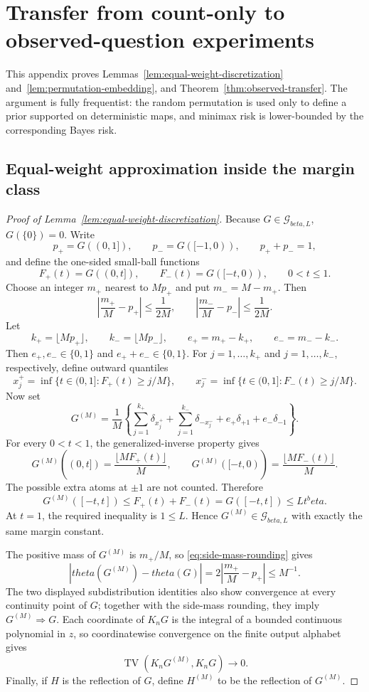 \documentclass[11pt]{article}
\def\beta{beta}%
\def\theta{theta}%
\newcommand{\TV}{\operatorname{TV}}
\newcommand{\calG}{\mathcal G}
\begin{document}
\section{Transfer from count-only to observed-question experiments}
\label{app:observed-transfer}

This appendix proves Lemmas~\ref{lem:equal-weight-discretization} and~\ref{lem:permutation-embedding}, and Theorem~\ref{thm:observed-transfer}.  The argument is fully frequentist: the random permutation is used only to define a prior supported on deterministic maps, and minimax risk is lower-bounded by the corresponding Bayes risk.

\subsection{Equal-weight approximation inside the margin class}

\begin{proof}[Proof of Lemma~\ref{lem:equal-weight-discretization}]
Because $G\in\calG_{\beta,L}$, $G(\{0\})=0$.  Write
\[
p_+=G((0,1]),
\qquad
p_-=G([-1,0)),
\qquad
p_++p_-=1,
\]
and define the one-sided small-ball functions
\[
F_+(t)=G((0,t]),
\qquad
F_-(t)=G([-t,0)),
\qquad 0<t\le1.
\]
Choose an integer $m_+$ nearest to $Mp_+$ and put $m_-=M-m_+$.  Then
\begin{equation}
\label{eq:side-mass-rounding}
\left|\frac{m_+}{M}-p_+\right|\le\frac1{2M},
\qquad
\left|\frac{m_-}{M}-p_-\right|\le\frac1{2M}.
\end{equation}
Let
\[
k_+=\lfloor Mp_+\rfloor,
\qquad
k_-=\lfloor Mp_-\rfloor,
\qquad
e_+=m_+-k_+,
\qquad
e_-=m_--k_-.
\]
Then $e_+,e_-\in\{0,1\}$ and $e_++e_-\in\{0,1\}$.  For $j=1,\dots,k_+$ and $j=1,\dots,k_-$, respectively, define outward quantiles
\[
x_j^+
=
\inf\{t\in(0,1]:F_+(t)\ge j/M\},
\qquad
x_j^-
=
\inf\{t\in(0,1]:F_-(t)\ge j/M\}.
\]
Now set
\begin{equation}
\label{eq:outward-quantile-measure}
G^{(M)}
=
\frac1M
\left\{
\sum_{j=1}^{k_+}\delta_{x_j^+}
+
\sum_{j=1}^{k_-}\delta_{-x_j^-}
+
e_+\delta_{+1}
+
e_-\delta_{-1}
\right\}.
\end{equation}
For every $0<t<1$, the generalized-inverse property gives
\[
G^{(M)}((0,t])
=
\frac{\lfloor MF_+(t)\rfloor}{M},
\qquad
G^{(M)}([-t,0))
=
\frac{\lfloor MF_-(t)\rfloor}{M}.
\]
The possible extra atoms at $\pm1$ are not counted.  Therefore
\[
G^{(M)}([-t,t])
\le
F_+(t)+F_-(t)
=
G([-t,t])
\le
Lt^\beta.
\]
At $t=1$, the required inequality is $1\le L$.  Hence $G^{(M)}\in\calG_{\beta,L}$ with exactly the same margin constant.

The positive mass of $G^{(M)}$ is $m_+/M$, so \eqref{eq:side-mass-rounding} gives
\[
|\theta(G^{(M)})-\theta(G)|
=
2\left|\frac{m_+}{M}-p_+\right|
\le M^{-1}.
\]
The two displayed subdistribution identities also show convergence at every continuity point of $G$; together with the side-mass rounding, they imply $G^{(M)}\Rightarrow G$.  Each coordinate of $K_nG$ is the integral of a bounded continuous polynomial in $z$, so coordinatewise convergence on the finite output alphabet gives
\[
\TV(K_nG^{(M)},K_nG)\to0.
\]
Finally, if $H$ is the reflection of $G$, define $H^{(M)}$ to be the reflection of $G^{(M)}$.
\end{proof}
\end{document}
